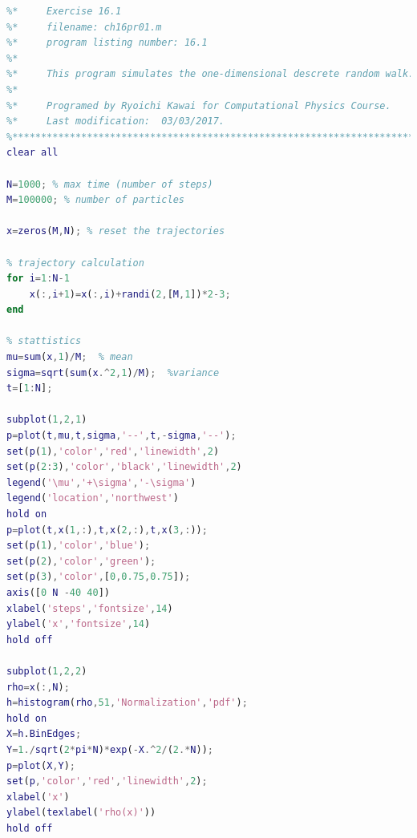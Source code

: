 \noindent
\program
\label{prog:rw_1d}
\footnotesize
\begin{lstlisting}[language=matlab]
%**************************************************************************
%*     Exercise 16.1                                                      *
%*     filename: ch16pr01.m                                               *
%*     program listing number: 16.1                                       *
%*                                                                        *
%*     This program simulates the one-dimensional descrete random walk.   *
%*                                                                        *
%*     Programed by Ryoichi Kawai for Computational Physics Course.       *
%*     Last modification:  03/03/2017.                                    *
%**************************************************************************
clear all

N=1000; % max time (number of steps)
M=100000; % number of particles

x=zeros(M,N); % reset the trajectories

% trajectory calculation
for i=1:N-1
    x(:,i+1)=x(:,i)+randi(2,[M,1])*2-3;
end

% stattistics
mu=sum(x,1)/M;  % mean
sigma=sqrt(sum(x.^2,1)/M);  %variance
t=[1:N];

subplot(1,2,1)
p=plot(t,mu,t,sigma,'--',t,-sigma,'--');
set(p(1),'color','red','linewidth',2)
set(p(2:3),'color','black','linewidth',2)
legend('\mu','+\sigma','-\sigma')
legend('location','northwest')
hold on
p=plot(t,x(1,:),t,x(2,:),t,x(3,:));
set(p(1),'color','blue');
set(p(2),'color','green');
set(p(3),'color',[0,0.75,0.75]);
axis([0 N -40 40])
xlabel('steps','fontsize',14)
ylabel('x','fontsize',14)
hold off

subplot(1,2,2)
rho=x(:,N);
h=histogram(rho,51,'Normalization','pdf');
hold on
X=h.BinEdges;
Y=1./sqrt(2*pi*N)*exp(-X.^2/(2.*N));
p=plot(X,Y);
set(p,'color','red','linewidth',2);
xlabel('x')
ylabel(texlabel('rho(x)'))
hold off
\end{lstlisting}
\normalsize

